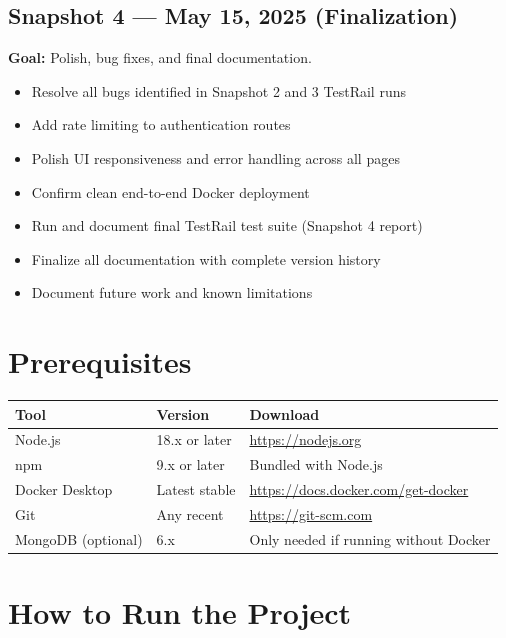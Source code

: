 \documentclass[12pt]{article}
\begin{document}
\subsection{Snapshot 4 --- May 15, 2025 (Finalization)}
\textbf{Goal:} Polish, bug fixes, and final documentation.
\begin{itemize}
    \item Resolve all bugs identified in Snapshot 2 and 3 TestRail runs
    \item Add rate limiting to authentication routes
    \item Polish UI responsiveness and error handling across all pages
    \item Confirm clean end-to-end Docker deployment
    \item Run and document final TestRail test suite (Snapshot 4 report)
    \item Finalize all documentation with complete version history
    \item Document future work and known limitations
\end{itemize}

\section{Prerequisites}

\begin{longtable}{|p{4cm}|p{3cm}|p{7cm}|}
\hline
\textbf{Tool} & \textbf{Version} & \textbf{Download} \\
\hline
Node.js & 18.x or later & \url{https://nodejs.org} \\
\hline
npm & 9.x or later & Bundled with Node.js \\
\hline
Docker Desktop & Latest stable & \url{https://docs.docker.com/get-docker} \\
\hline
Git & Any recent & \url{https://git-scm.com} \\
\hline
MongoDB (optional) & 6.x & Only needed if running without Docker \\
\hline
\end{longtable}

\section{How to Run the Project}
\end{document}

